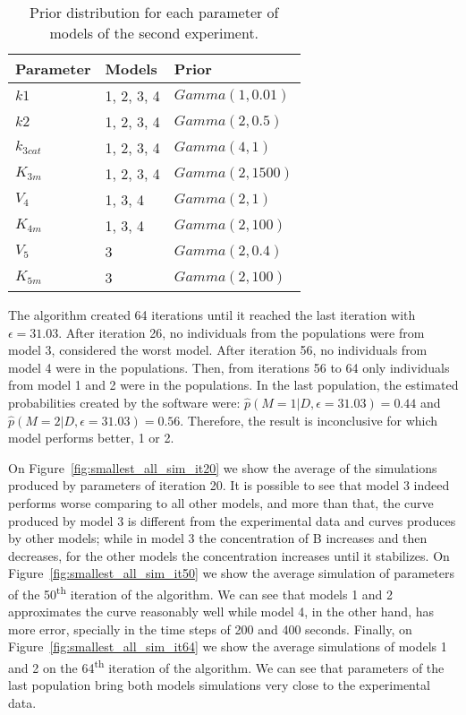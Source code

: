 \begin{table}[h]
\centering
\begin{tabular}{l l l}
Parameter   & Models     & Prior             \\ \hline
\hline
$k1$        & 1, 2, 3, 4 & $Gamma (1, 0.01)$ \\
$k2$        & 1, 2, 3, 4 & $Gamma (2, 0.5)$  \\
$k_{3cat}$  & 1, 2, 3, 4 & $Gamma (4, 1)$    \\
$K_{3m}$    & 1, 2, 3, 4 & $Gamma (2, 1500)$ \\
$V_4$       & 1, 3, 4    & $Gamma (2, 1)$    \\
$K_{4m}$    & 1, 3, 4    & $Gamma (2, 100)$  \\
$V_5$       & 3          & $Gamma (2, 0.4)$  \\
$K_{5m}$    & 3          & $Gamma (2, 100)$  \\ \hline
\end{tabular}
\caption{Prior distribution for each parameter of models of the second 
    experiment.}
\label{tab:smallest_priors}
\end{table}

The algorithm created 64 iterations until it reached the last iteration
with $\epsilon = 31.03$. After iteration 26, no individuals from the 
populations were from model 3, considered the worst model. After 
iteration 56, no individuals from model 4 were in the populations. Then,
from iterations 56 to 64 only individuals from model 1 and 2 were in 
the populations. In the last population, the estimated probabilities
created by the software were: 
$\hat{p} (M = 1 | D, \epsilon = 31.03) = 0.44$ and 
$\hat{p} (M = 2 | D, \epsilon = 31.03) = 0.56$. Therefore, the result
is inconclusive for which model performs better, 1 or 2. 

On Figure~\ref{fig:smallest_all_sim_it20} we show the average of the 
simulations produced by parameters of iteration 20. It is possible to
see that model 3 indeed performs worse comparing to all other models,
and more than that, the curve produced by model 3 is different from the 
experimental data and curves produces by other models; while in model 3
the concentration of B increases and then decreases, for the other 
models the concentration increases until it stabilizes. On 
Figure~\ref{fig:smallest_all_sim_it50} we show the average simulation
of parameters of the 50\textsuperscript{th} iteration of the algorithm.
We can see that models 1 and 2 approximates the curve reasonably well
while model 4, in the other hand, has more error, specially in the 
time steps of 200 and 400 seconds. Finally, on 
Figure~\ref{fig:smallest_all_sim_it64} we show the average simulations 
of models 1 and 2 on the 64\textsuperscript{th} iteration of the 
algorithm. We can see that parameters of the last population bring both
models simulations very close to the experimental data.

